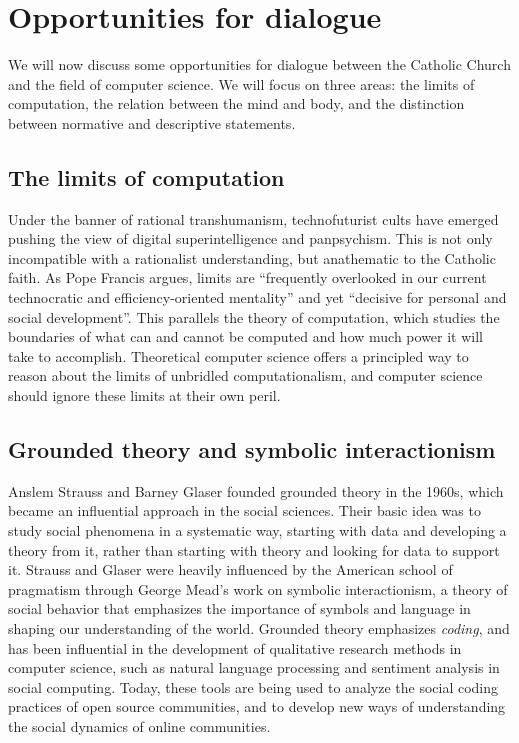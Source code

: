 \documentclass[sigplan,nonacm]{acmart}\settopmatter{printfolios=false,printccs=false,printacmref=false}
\begin{document}
  \section{Opportunities for dialogue}

  We will now discuss some opportunities for dialogue between the Catholic Church and the field of computer science. We will focus on three areas: the limits of computation, the relation between the mind and body, and the distinction between normative and descriptive statements.

  \subsection{The limits of computation}

  Under the banner of rational transhumanism, technofuturist cults have emerged pushing the view of digital superintelligence and panpsychism. This is not only incompatible with a rationalist understanding, but anathematic to the Catholic faith. As Pope Francis argues, limits are ``frequently overlooked in our current technocratic and efficiency-oriented mentality'' and yet ``decisive for personal and social development''. This parallels the theory of computation, which studies the boundaries of what can and cannot be computed and how much power it will take to accomplish. Theoretical computer science offers a principled way to reason about the limits of unbridled computationalism, and computer science should ignore these limits at their own peril.


  \subsection{Grounded theory and symbolic interactionism}

  Anslem Strauss and Barney Glaser founded grounded theory in the 1960s, which became an influential approach in the social sciences. Their basic idea was to study social phenomena in a systematic way, starting with data and developing a theory from it, rather than starting with theory and looking for data to support it. Strauss and Glaser were heavily influenced by the American school of pragmatism through George Mead's work on symbolic interactionism, a theory of social behavior that emphasizes the importance of symbols and language in shaping our understanding of the world. Grounded theory emphasizes \textit{coding}, and has been influential in the development of qualitative research methods in computer science, such as natural language processing and sentiment analysis in social computing. Today, these tools are being used to analyze the social coding practices of open source communities, and to develop new ways of understanding the social dynamics of online communities.
\end{document}
